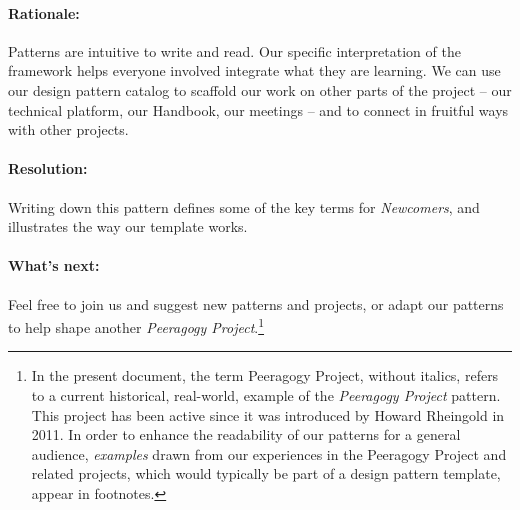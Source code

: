 \paragraph{Rationale:}
Patterns are intuitive to write and read. Our specific interpretation of the framework helps everyone involved integrate what they are learning.  We can use our design pattern catalog to scaffold our work on other parts of the project -- our technical platform, our Handbook, our meetings -- and to connect in fruitful ways with other projects.  

\paragraph{Resolution:}  
Writing down this pattern defines some of the key terms for \emph{Newcomers}, and illustrates the way our template works. 

\paragraph{What's next:} 
Feel free to join us and suggest new patterns and projects, or adapt our patterns to help shape another \emph{Peeragogy Project}.\footnote{In the present document, the term Peeragogy Project, without italics, refers to a current historical, real-world, example of the \emph{Peeragogy Project} pattern. This project has been active since it was introduced by Howard Rheingold in 2011. In order to enhance the readability of our patterns for a general audience, \emph{examples} drawn from our experiences in the Peeragogy Project and related projects, which would typically be part of a design pattern template, appear in footnotes.}